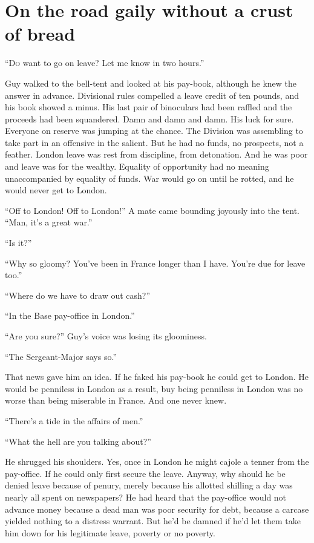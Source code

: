 \chapter*{\textsf{On the road gaily without a crust of bread}}

``D\textsc{o} want to go on leave? Let me know in two hours.''

Guy walked to the bell-tent and looked at his pay-book, although he knew the answer in advance. Divisional rules compelled a leave credit of ten pounds, and his book showed a minus. His last pair of binoculars had been raffled and the proceeds had been squandered. Damn and damn and damn. His luck for sure. Everyone on reserve was jumping at the chance. The Division was assembling to take part in an offensive in the salient. But he had no funds, no prospects, not a feather. London leave was rest from discipline, from detonation. And he was poor and leave was for the wealthy. Equality of opportunity had no meaning unaccompanied by equality of funds. War would go on until he rotted, and he would never get to London.

``Off to London! Off to London!'' A mate came bounding joyously into the tent. ``Man, it's a great war.''

``Is it?''

``Why so gloomy? You've been in France longer than I have. You're due for leave too.''

``Where do we have to draw out cash?''

``In the Base pay-office in London.''

``Are you sure?'' Guy's voice was losing its gloominess.

``The Sergeant-Major says so.''

That news gave him an idea. If he faked his pay-book he could get to London. He would be penniless in London as a result, buy being penniless in London was no worse than being miserable in France. And one never knew.

``There's a tide in the affairs of men.''

``What the hell are you talking about?''

He shrugged his shoulders. Yes, once in London he might cajole a tenner from the pay-office. If he could only first secure the leave. Anyway, why should he be denied leave because of penury, merely because his allotted shilling a day was nearly all spent on newspapers? He had heard that the pay-office would not advance money because a dead man was poor security for debt, because a carcase yielded nothing to a distress warrant. But he'd be damned if he'd let them take him down for his legitimate leave, poverty or no poverty.

